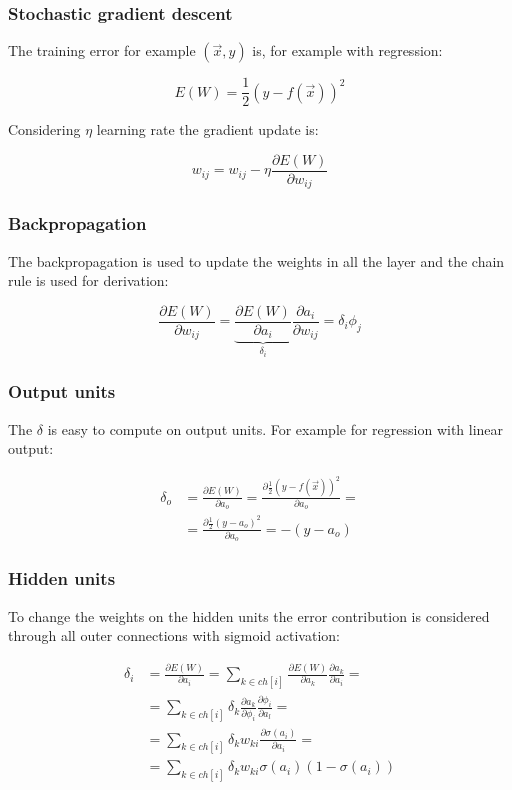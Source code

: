 		\subsubsection{Stochastic gradient descent}
		The training error for example $(\vec{x},y)$ is, for example with regression:

		$$E(W) = \frac{1}{2}(y-f(\vec{x}))^2$$

		Considering $\eta$ learning rate the gradient update is:

		$$w_{ij} = w_{ij}-\eta\frac{\partial E(W)}{\partial w_{ij}}$$

		\subsubsection{Backpropagation}
		The backpropagation is used to update the weights in all the layer and the chain rule is used for derivation:

		$$\frac{\partial E(W)}{\partial w_{ij}} = \underbrace{\frac{\partial E(W)}{\partial a_i}}_{\delta_i}\frac{\partial a_i}{\partial w_{ij}} = \delta_i\phi_j$$

		\subsubsection{Output units}
		The $\delta$ is easy to compute on output units.
		For example for regression with linear output:

		\begin{align*}
			\delta_o &= \frac{\partial E(W)}{\partial a_o} = \frac{\partial\frac{1}{2}(y-f(\vec{x}))^2}{\partial a_o}=\\
				 &=\frac{\partial \frac{1}{2}(y-a_o)^2}{\partial a_o} = -(y-a_o)
		\end{align*}

		\subsubsection{Hidden units}
		To change the weights on the hidden units the error contribution is considered through all outer connections with sigmoid activation:

		\begin{align*}
			\delta_i &= \frac{\partial E(W)}{\partial a_i}  = \sum\limits_{k\in ch[i]}\frac{\partial E(W)}{\partial a_k}\frac{\partial a_k}{\partial a_i}=\\
				 &=\sum\limits_{k\in ch[i]} \delta_k\frac{\partial a_k}{\partial\phi_i}\frac{\partial\phi_i}{\partial a_l}=\\
				 &=\sum\limits_{k\in ch[i]}\delta_kw_{ki}\frac{\partial\sigma(a_i)}{\partial a_i}=\\
				 &=\sum\limits_{k\in ch[i]}\delta_kw_{ki}\sigma(a_i)(1-\sigma(a_i))
		\end{align*}

